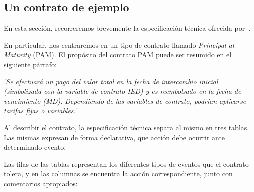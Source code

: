 \documentclass[12pt]{book}
\begin{document}
\subsection{Un contrato de ejemplo}


En esta sección, recorreremos brevemente la especificación técnica ofrecida por~\cite{ACTUS_Techspecs}.

En particular, nos centraremos en un tipo de contrato llamado \textit{Principal at Maturity} (PAM). El propósito del contrato PAM puede ser resumido en el siguiente párrafo:

\textit{'Se efectuará un pago del valor total en la fecha de intercambio inicial (simbolizada con la variable de contrato IED) y es reembolsado en la fecha de vencimiento (MD). Dependiendo de las variables de contrato, podrían aplicarse tarifas fijas o variables.'}

Al describir el contrato, la especificación técnica separa al mismo en tres tablas. Las mismas expresan de forma declarativa, que acción debe ocurrir ante determinado evento.

Las filas de las tablas representan los diferentes tipos de eventos que el contrato tolera, y en las columnas se encuentra la acción correspondiente, junto con comentarios apropiados:
\end{document}
